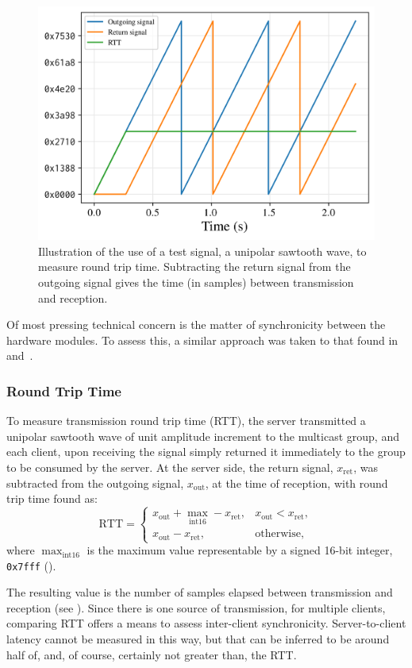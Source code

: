 \begin{figure}[ht]
    \centering
    \includegraphics[width=.5\textwidth]{figures/test-signal}
    \caption{
        Illustration of the use of a test signal, a unipolar sawtooth wave,
        to measure round trip time.
        Subtracting the return signal from the outgoing signal gives the time
        (in samples) between transmission and reception.
    }
    \label{fig:test-signal}
\end{figure}
\noindent
Of most pressing technical concern is the matter of synchronicity between the
hardware modules.
To assess this, a similar approach was taken to that found
in~\citep{rushton_microcontroller-based_2023}
and~\citep{gabrielli_networked_2012}.

\subsubsection{Round Trip Time}
To measure transmission round trip time (RTT), the server transmitted a unipolar
sawtooth wave of unit amplitude increment to the multicast group, and each
client, upon receiving the signal simply returned it immediately to the group to
be consumed by the server.
At the server side, the return signal, $x_{\text{ret}}$, was subtracted from the
outgoing signal, $x_{\text{out}}$, at the time of reception, with round trip
time found as:
\begin{equation}
    \label{eq:rtt}
    \text{RTT} = \begin{cases}
                     x_{\text{out}} + \max_{\text{int16}} - x_{\text{ret}}, &x_{\text{out}} < x_{\text{ret}}, \\
                     x_{\text{out}} - x_{\text{ret}}, &\text{otherwise},
    \end{cases}
\end{equation}
where $\max_{\text{int16}}$ is the maximum value representable by a
signed 16-bit integer, \texttt{0x7fff} ().

The resulting value is the number of samples elapsed between transmission and
reception (see ).
Since there is one source of transmission, for multiple clients, comparing RTT
offers a means to assess inter-client synchronicity.
Server-to-client latency cannot be measured in this way, but that can be
inferred to be around half of, and, of course, certainly not greater than, the
RTT.\

